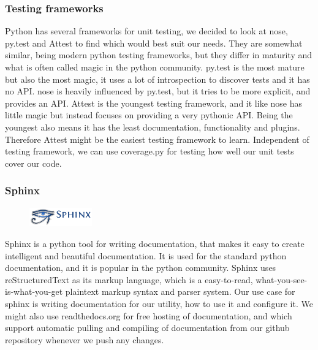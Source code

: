 \subsubsection{Testing frameworks}
Python has several frameworks for unit testing, we decided to look at nose,
py.test and Attest to find which would best suit our needs. They are somewhat
similar, being modern python testing frameworks, but they differ in maturity
and what is often called magic in the python community. py.test is the most
mature but also the most magic, it uses a lot of introspection to discover
tests and it has no API. nose is heavily influenced by py.test, but it tries to
be more explicit, and provides an API. Attest is the youngest testing
framework, and it like nose has little magic but instead focuses on providing
a very pythonic API. Being the youngest also means it has the least
documentation, functionality and plugins. Therefore Attest might be the easiest
testing framework to learn. Independent of testing framework, we can use
coverage.py for testing how well our unit tests cover our code.

\subsubsection{Sphinx}
\begin{figure}
	\begin{center}
	\vspace{-30pt}
		\includegraphics[width=2.7cm]{./planning/img/sphinx_logo}
	\vspace{-30pt}
	\end{center}
\end{figure}
Sphinx is a python tool for writing documentation, that makes it easy to create
intelligent and beautiful documentation. It is used for the standard python
documentation, and it is  popular in the python community. Sphinx uses
reStructuredText as its markup language, which is a easy-to-read,
what-you-see-is-what-you-get plaintext markup syntax and parser system. Our use
case for sphinx is writing documentation for our utility, how to use it and
configure it. We might also use readthedocs.org for free hosting of
documentation, and which support automatic pulling and compiling of
documentation from our github repository whenever we push any changes.

